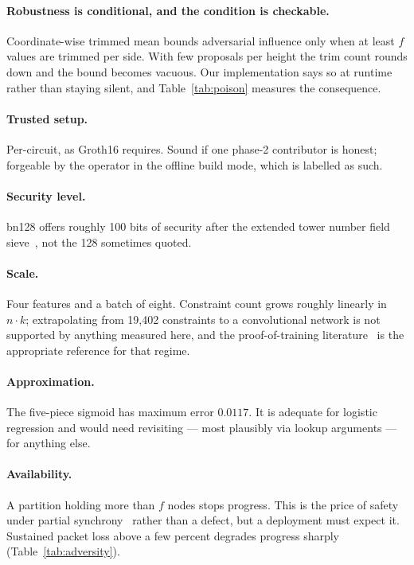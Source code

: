 \documentclass{llncs}
\begin{document}
\paragraph{Robustness is conditional, and the condition is checkable.}
Coordinate-wise trimmed mean bounds adversarial influence only when at least $f$
values are trimmed per side. With few proposals per height the trim count rounds
down and the bound becomes vacuous. Our implementation says so at runtime rather
than staying silent, and Table~\ref{tab:poison} measures the consequence.

\paragraph{Trusted setup.}
Per-circuit, as Groth16 requires. Sound if one phase-2 contributor is honest;
forgeable by the operator in the offline build mode, which is labelled as such.

\paragraph{Security level.}
bn128 offers roughly 100 bits of security after the extended tower number field
sieve~\cite{kim2016extnfs,barbulescu2019updating}, not the 128 sometimes quoted.

\paragraph{Scale.}
Four features and a batch of eight. Constraint count grows roughly linearly in
$n \cdot k$; extrapolating from 19{,}402 constraints to a convolutional network
is not supported by anything measured here, and the proof-of-training
literature~\cite{garg2023zkpot,abbaszadeh2024kaizen} is the appropriate
reference for that regime.

\paragraph{Approximation.}
The five-piece sigmoid has maximum error $0.0117$. It is adequate for logistic
regression and would need revisiting --- most plausibly via lookup arguments --- for
anything else.

\paragraph{Availability.}
A partition holding more than $f$ nodes stops progress. This is the price of
safety under partial synchrony~\cite{fischer1985flp} rather than a defect, but a
deployment must expect it. Sustained packet loss above a few percent degrades
progress sharply (Table~\ref{tab:adversity}).
\end{document}
